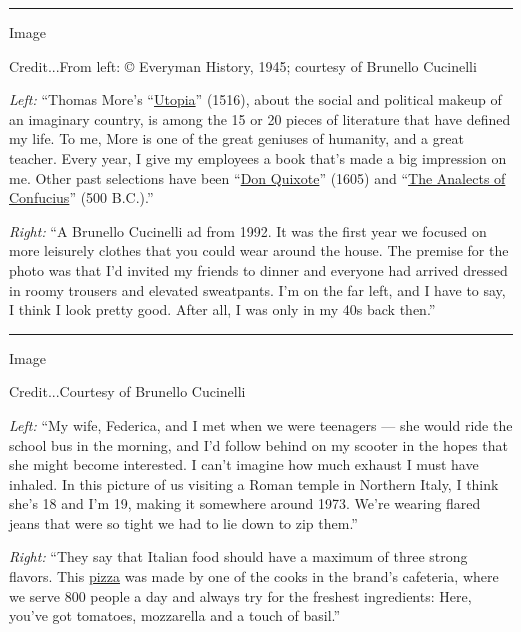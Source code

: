 \begin{center}\rule{0.5\linewidth}{\linethickness}\end{center}

Image

Credit...From left: © Everyman History, 1945; courtesy of Brunello
Cucinelli

\emph{Left:} ``Thomas More's
``\href{https://www.bl.uk/learning/timeline/item126618.html}{Utopia}''
(1516), about the social and political makeup of an imaginary country,
is among the 15 or 20 pieces of literature that have defined my life. To
me, More is one of the great geniuses of humanity, and a great teacher.
Every year, I give my employees a book that's made a big impression on
me. Other past selections have been
``\href{https://www.penguinrandomhouse.com/books/286572/don-quixote-by-miguel-de-cervantes-saavedra/9780142437230/}{Don
Quixote}'' (1605) and
``\href{https://www.penguinrandomhouse.com/books/306130/the-analects-by-confucius/9780143106852/}{The
Analects of Confucius}'' (500 B.C.).''

\emph{Right:} ``A Brunello Cucinelli ad from 1992. It was the first year
we focused on more leisurely clothes that you could wear around the
house. The premise for the photo was that I'd invited my friends to
dinner and everyone had arrived dressed in roomy trousers and elevated
sweatpants. I'm on the far left, and I have to say, I think I look
pretty good. After all, I was only in my 40s back then.''

\begin{center}\rule{0.5\linewidth}{\linethickness}\end{center}

Image

Credit...Courtesy of Brunello Cucinelli

\emph{Left:} ``My wife, Federica, and I met when we were teenagers ---
she would ride the school bus in the morning, and I'd follow behind on
my scooter in the hopes that she might become interested. I can't
imagine how much exhaust I must have inhaled. In this picture of us
visiting a Roman temple in Northern Italy, I think she's 18 and I'm 19,
making it somewhere around 1973. We're wearing flared jeans that were so
tight we had to lie down to zip them.''

\emph{Right:} ``They say that Italian food should have a maximum of
three strong flavors. This
\href{https://cooking.nytimes3xbfgragh.onion/68861692-nyt-cooking/807163-our-greatest-pizza-recipes}{pizza}
was made by one of the cooks in the brand's cafeteria, where we serve
800 people a day and always try for the freshest ingredients: Here,
you've got tomatoes, mozzarella and a touch of basil.''

